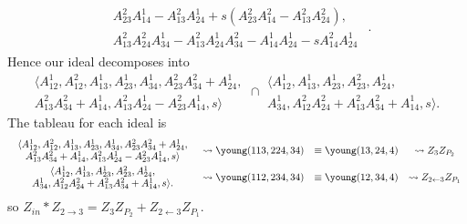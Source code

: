 \documentclass{article} %
\begin{document}
\begin{example}
\[\begin{array}{c|c}
\begin{array}{c}
         A_{23}^2A_{14}^1 - A_{13}^2A_{24}^1 + s(A_{23}^2A_{14}^2 - A_{13}^2A_{24}^2), \\
         A_{13}^2A_{24}^2A_{34}^1 - A_{13}^2A_{24}^1A_{34}^2 - A_{14}^1A_{24}^1 - sA_{14}^2A_{24}^1 
    \end{array} 
\end{array}.
\]
Hence our ideal decomposes into 
\[\begin{array}{c}
     \langle A_{12}^1, A_{12}^2, A_{13}^1, A_{23}^1, A_{34}^1, A_{23}^2A_{34}^2 + A_{24}^1,  \\
     A_{13}^2A_{34}^2 + A_{14}^1, A_{13}^2A_{24}^1 - A_{23}^2A_{14}^1,s \rangle  
\end{array}
 \cap \begin{array}{c}
      \langle A_{12}^1, A_{13}^1, A_{23}^1, A_{23}^2, A_{24}^1,  \\
      A_{34}^1, A_{12}^2A_{24}^2 + A_{13}^2A_{34}^2 + A_{14}^1,s \rangle. 
 \end{array} 
\]
The tableau for each ideal is
\[\begin{array}{cccc}\vspace{1mm}
    \begin{array}{c}
     \langle A_{12}^1, A_{12}^2, A_{13}^1, A_{23}^1, A_{34}^1, A_{23}^2A_{34}^2 + A_{24}^1,  \\
     A_{13}^2A_{34}^2 + A_{14}^1, A_{13}^2A_{24}^1 - A_{23}^2A_{14}^1,s \rangle  
\end{array} &\leadsto \young(113,224,34) &\equiv \young(13,24,4) &\leadsto Z_3 Z_{P_2} \\ 
    \begin{array}{c}
      \langle A_{12}^1, A_{13}^1, A_{23}^1, A_{23}^2, A_{24}^1,  \\
      A_{34}^1, A_{12}^2A_{24}^2 + A_{13}^2A_{34}^2 + A_{14}^1,s \rangle. 
 \end{array} &\leadsto \young(112,234,34) &\equiv \young(12,34,4) &\leadsto Z_{2 \leftarrow 3} Z_{P_1}
\end{array}
\]
so $Z_{in} * Z_{2 \rightarrow 3} = Z_3 Z_{P_2} + Z_{2 \leftarrow 3} Z_{P_1}$.
\end{example}
\end{document}
